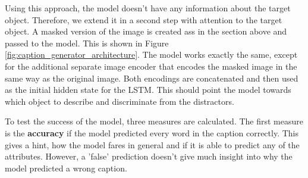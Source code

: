 Using this approach, the model doesn't have any information about the target object.
Therefore, we extend it in a second step with attention to the target object.
A masked version of the image is created ass in the section above and passed to the model.
This is shown in Figure \ref{fig:caption_generator_architecture}.
The model works exactly the same, except for the additional separate image encoder that encodes the masked image in the same way as the original image.
Both encodings are concatenated and then used as the initial hidden state for the LSTM.
This should point the model towards which object to describe and discriminate from the distractors.

To test the success of the model, three measures are calculated.
The first measure is the \textbf{accuracy} if the model predicted every word in the caption correctly.
This gives a hint, how the model fares in general and if it is able to predict any of the attributes.
However, a 'false' prediction doesn't give much insight into why the model predicted a wrong caption.

